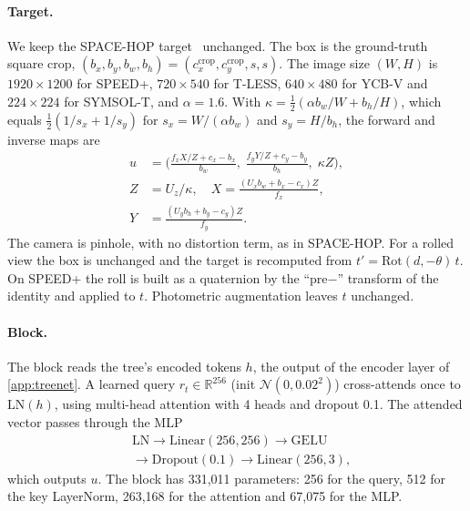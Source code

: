 \paragraph{Target.}
We keep the SPACE-HOP target~\cite{dutta2026spacehop} unchanged. The box is the ground-truth square crop, $(b_x,b_y,b_w,b_h)=(c_x^{\text{crop}},c_y^{\text{crop}},s,s)$. The image size $(W,H)$ is $1920\times1200$ for SPEED+, $720\times540$ for T-LESS, $640\times480$ for YCB-V and $224\times224$ for SYMSOL-T, and $\alpha=1.6$. With $\kappa=\tfrac12(\alpha b_w/W+b_h/H)$, which equals $\tfrac12(1/s_x+1/s_y)$ for $s_x=W/(\alpha b_w)$ and $s_y=H/b_h$, the forward and inverse maps are
\begin{align}
  u&=\Big(\tfrac{f_xX/Z+c_x-b_x}{b_w},\;\tfrac{f_yY/Z+c_y-b_y}{b_h},\;\kappa Z\Big),\\
  Z&=U_z/\kappa,\quad X=\tfrac{(U_xb_w+b_x-c_x)Z}{f_x},\\
  Y&=\tfrac{(U_yb_h+b_y-c_y)Z}{f_y}.
\end{align}
The camera is pinhole, with no distortion term, as in SPACE-HOP. For a rolled view the box is unchanged and the target is recomputed from $t'=\mathrm{Rot}(d,-\theta)\,t$. On SPEED+ the roll is built as a quaternion by the ``pre$-$'' transform of the identity and applied to $t$. Photometric augmentation leaves $t$ unchanged.

\paragraph{Block.}
The block reads the tree's encoded tokens $h$, the output of the encoder layer of \cref{app:treenet}. A learned query $r_t\in\mathbb{R}^{256}$ (init $\mathcal{N}(0,0.02^2)$) cross-attends once to $\mathrm{LN}(h)$, using multi-head attention with 4 heads and dropout 0.1. The attended vector passes through the MLP
\begin{equation}
\begin{split}
  &\mathrm{LN}\to\mathrm{Linear}(256,256)\to\mathrm{GELU}\\
  &\to\mathrm{Dropout}(0.1)\to\mathrm{Linear}(256,3),
\end{split}
\end{equation}
which outputs $u$. The block has 331,011 parameters: 256 for the query, 512 for the key LayerNorm, 263,168 for the attention and 67,075 for the MLP.

